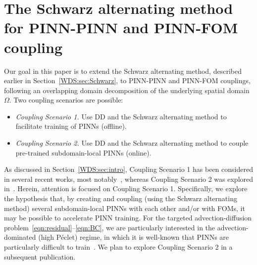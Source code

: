 \documentclass[oneside,final]{csri23}
\begin{document}
\section{The Schwarz alternating method for PINN-PINN and PINN-FOM coupling} \label{WDS:sec:pinns_schwarz}

Our goal in this paper is to extend the Schwarz alternating method, described earlier in Section~\ref{WDS:sec:Schwarz}, to PINN-PINN and PINN-FOM couplings, following an overlapping domain decomposition of the underlying spatial domain $\Omega$.  Two coupling scenarios are possible: 
\begin{itemize}
    \item \textit{Coupling Scenario 1.} Use DD and the Schwarz alternating method to facilitate training of PINNs (offline).
    \item \textit{Coupling Scenario 2.} Use DD and the Schwarz alternating method to couple pre-trained subdomain-local PINNs (online).  
\end{itemize}
As discussed in Section~\ref{WDS:sec:intro}, Coupling Scenario 1 has been considered in several recent works, most notably~\cite{WDS:LiD3M, WDS:LiDeepDDM, WDS:Heinlein:2020}, whereas Coupling Scenario 2 was explored in~\cite{WDS:Wang:2022}. Herein, attention is focused on Coupling Scenario 1. Specifically, we explore the hypothesis that, by creating and coupling (using the Schwarz alternating method) several subdomain-local PINNs with each other and/or with FOMs, it may be possible to accelerate PINN training. For the targeted advection-diffusion problem~\eqref{eqn:residual}--\eqref{eqn:BC}, we are particularly interested in the advection-dominated (high P\'{e}clet) regime, in which it is well-known that PINNs are particularly difficult to train~\cite{WDS:Mojgani:2023}. 
We plan to explore Coupling Scenario 2 in a subsequent publication.  
\end{document}
